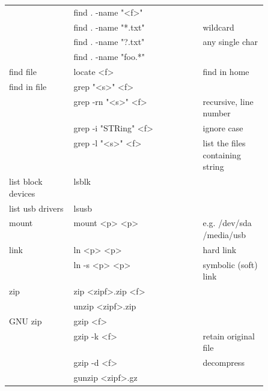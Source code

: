 {\begin{tabularx}{\linewidth}{@{} p{0.25\linewidth}>{\ttfamily}lp{0.25\linewidth} @{}}
                             & find . -name "<f>"         &                                  \\
                             & find . -name "*.txt"       & wildcard                         \\
                             & find . -name "?.txt"       & any single char                  \\
                             & find . -name "foo.*"       &                                  \\
        find file            & locate <f>                 & find in home                     \\
        find in file         & grep "<s>" <f>             &                                  \\
                             & grep -rn "<s>" <f>         & recursive, line number           \\
                             & grep -i "STRing" <f>       & ignore case                      \\
                             & grep -l "<s>" <f>          & list the files containing string \\
        list block devices   & lsblk                      &                                  \\
        list usb drivers     & lsusb                      &                                  \\
        mount                & mount <p> <p>              & e.g. /dev/sda /media/usb         \\
        link                 & ln <p> <p>                 & hard link                        \\
                             & ln -s <p> <p>              & symbolic (soft) link             \\
        zip                  & zip <zipf>.zip <f>         &                                  \\
                             & unzip <zipf>.zip           &                                  \\
        GNU zip              & gzip <f>                   &                                  \\
                             & gzip -k <f>                & retain original file             \\
                             & gzip -d <f>                & decompress                       \\
                             & gunzip <zipf>.gz           &                                  \\

\end{tabularx}}
